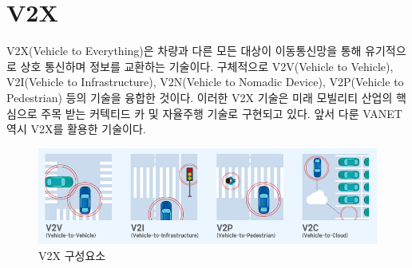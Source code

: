 \section{V2X}
    V2X(Vehicle to Everything)은 차량과 다른 모든 대상이 이동통신망을 통해 유기적으로 상호 통신하며 정보를 교환하는 기술이다. 구체적으로 V2V(Vehicle to Vehicle), V2I(Vehicle to Infrastructure), V2N(Vehicle to Nomadic Device), V2P(Vehicle to Pedestrian) 등의 기술을 융합한 것이다. 이러한 V2X 기술은 미래 모빌리티 산업의 핵심으로 주목 받는 커텍티드 카 및 자율주행 기술로 구현되고 있다. 앞서 다룬 VANET 역시 V2X를 활용한 기술이다. \\
    \vspace{-4mm}
    \begin{figure}[!h]\centering
		\includegraphics[width=.9\textwidth]{image/week13/3-1.png}
		\caption{\small V2X 구성요소}
		\vspace{-10pt}
    \end{figure}
    
